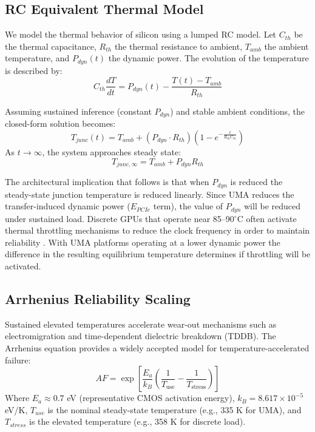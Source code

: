\documentclass[conference]{IEEEtran}
\begin{document}
\subsection{RC Equivalent Thermal Model}
We model the thermal behavior of silicon using a lumped RC model. Let $C_{th}$ be the thermal capacitance, $R_{th}$ the thermal resistance to ambient, $T_{amb}$ the ambient temperature, and $P_{dyn}(t)$ the dynamic power. The evolution of the temperature is described by:
\begin{equation}
C_{th} \frac{dT}{dt} = P_{dyn}(t) - \frac{T(t) - T_{amb}}{R_{th}}
\end{equation}

Assuming sustained inference (constant $P_{dyn}$) and stable ambient conditions, the closed-form solution becomes:
\begin{equation}
T_{junc}(t) = T_{amb} + (P_{dyn} \cdot R_{th})\left(1 - e^{-\frac{t}{R_{th}C_{th}}}\right)
\end{equation}
As $t \to \infty$, the system approaches steady state:
\begin{equation}
T_{junc,\infty} = T_{amb} + P_{dyn} R_{th}
\end{equation}

The architectural implication that follows is that when $P_{dyn}$ is reduced the steady-state junction temperature is reduced linearly. Since UMA reduces the transfer-induced dynamic power ($E_{PCIe}$ term), the value of $P_{dyn}$ will be reduced under sustained load. Discrete GPUs that operate near 85--90$^\circ$C often activate thermal throttling mechanisms to reduce the clock frequency in order to maintain reliability \cite{b21}. With UMA platforms operating at a lower dynamic power the difference in the resulting equilibrium temperature determines if throttling will be activated.

\subsection{Arrhenius Reliability Scaling}
Sustained elevated temperatures accelerate wear-out mechanisms such as electromigration and time-dependent dielectric breakdown (TDDB). The Arrhenius equation provides a widely accepted model for temperature-accelerated failure:
\begin{equation}
AF = \exp\left[ \frac{E_a}{k_B} \left(\frac{1}{T_{\text{use}}} - \frac{1}{T_{\text{stress}}}\right) \right]
\end{equation}
Where $E_a \approx 0.7$ eV (representative CMOS activation energy), $k_B = 8.617 \times 10^{-5}$ eV/K, $T_{use}$ is the nominal steady-state temperature (e.g., 335 K for UMA), and $T_{stress}$ is the elevated temperature (e.g., 358 K for discrete load).
\end{document}
